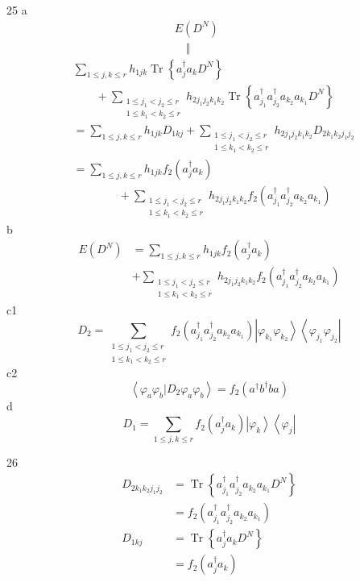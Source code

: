\documentclass[aps,preprint]{revtex4}%
\begin{document}
25 a%
\begin{align*}
&  \qquad\qquad\qquad\qquad\quad E\left(  D^{N}\right)  \\
&  \qquad\qquad\qquad\qquad\qquad\Vert\\
&  \sum_{1\leq j,k\leq r}h_{1jk}\operatorname{Tr}\left\{  a_{j}^{\dagger}%
a_{k}D^{N}\right\}  \\
&  \qquad+\sum_{\substack{1\leq j_{1}<j_{2}\leq r\\1\leq k_{1}<k_{2}\leq
r}}h_{2j_{1}j_{2}k_{1}k_{2}}\operatorname{Tr}\left\{  a_{j_{1}}^{\dagger
}a_{j_{2}}^{\dagger}a_{k_{2}}a_{k_{1}}D^{N}\right\}  \\
&  =\sum_{1\leq j,k\leq r}h_{1jk}D_{1kj}+\sum_{\substack{1\leq j_{1}<j_{2}\leq
r\\1\leq k_{1}<k_{2}\leq r}}h_{2j_{1}j_{2}k_{1}k_{2}}D_{2k_{1}k_{2}j_{1}j_{2}%
}\\
&  =\sum_{1\leq j,k\leq r}h_{1jk}f_{2}\left(  a_{j}^{\dagger}a_{k}\right)  \\
&  \qquad\qquad+\sum_{\substack{1\leq j_{1}<j_{2}\leq r\\1\leq k_{1}<k_{2}\leq
r}}h_{2j_{1}j_{2}k_{1}k_{2}}f_{2}\left(  a_{j_{1}}^{\dagger}a_{j_{2}}%
^{\dagger}a_{k_{2}}a_{k_{1}}\right)
\end{align*}
b%
\begin{align*}
E\left(  D^{N}\right)   &  =\sum_{1\leq j,k\leq r}h_{1jk}f_{2}\left(
a_{j}^{\dagger}a_{k}\right)  \\
&  +\sum_{\substack{1\leq j_{1}<j_{2}\leq r\\1\leq k_{1}<k_{2}\leq
r}}h_{2j_{1}j_{2}k_{1}k_{2}}f_{2}\left(  a_{j_{1}}^{\dagger}a_{j_{2}}%
^{\dagger}a_{k_{2}}a_{k_{1}}\right)
\end{align*}
c1%
\[
D_{2}=\sum_{\substack{1\leq j_{1}<j_{2}\leq r\\1\leq k_{1}<k_{2}\leq r}%
}f_{2}\left(  a_{j_{1}}^{\dagger}a_{j_{2}}^{\dagger}a_{k_{2}}a_{k_{1}}\right)
\left\vert \varphi_{k_{1}}\varphi_{k_{2}}\right\rangle \left\langle
\varphi_{j_{1}}\varphi_{j_{2}}\right\vert
\]
c2%
\[
\left\langle \varphi_{a}\varphi_{b}\left\vert D_{2}\right.  \varphi_{a}%
\varphi_{b}\right\rangle =f_{2}\left(  a^{\dagger}b^{\dagger}ba\right)
\]
d%
\[
D_{1}=\sum_{1\leq j,k\leq r}f_{2}\left(  a_{j}^{\dagger}a_{k}\right)
\left\vert \varphi_{k}\right\rangle \left\langle \varphi_{j}\right\vert
\]


26
\begin{align*}
D_{2k_{1}k_{2}j_{1}j_{2}}  &  =\operatorname{Tr}\left\{  a_{j_{1}}^{\dagger
}a_{j_{2}}^{\dagger}a_{k_{2}}a_{k_{1}}D^{N}\right\} \\
&  =f_{2}\left(  a_{j_{1}}^{\dagger}a_{j_{2}}^{\dagger}a_{k_{2}}a_{k_{1}%
}\right) \\
D_{1kj}  &  =\operatorname{Tr}\left\{  a_{j}^{\dagger}a_{k}D^{N}\right\} \\
&  =f_{2}\left(  a_{j}^{\dagger}a_{k}\right)
\end{align*}
\end{document}
